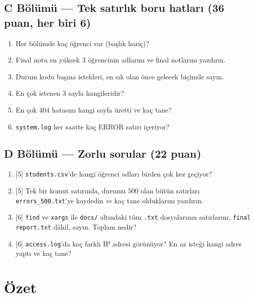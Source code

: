 \documentclass[11pt,a4paper]{article}
\newcommand{\cmd}[1]{\texttt{#1}}
\begin{document}
\subsection*{C Bölümü --- Tek satırlık boru hatları (36 puan, her biri 6)}
\begin{enumerate}[leftmargin=2.2em,label=\textbf{C\arabic*}]
  \item Her bölümde kaç öğrenci var (başlık hariç)?
  \item Final notu en yüksek $3$ öğrencinin adlarını ve final notlarını yazdırın.
  \item Durum kodu başına istekleri, en sık olan önce gelecek biçimde sayın.
  \item En çok istenen $3$ sayfa hangileridir?
  \item En çok $404$ hatasını hangi sayfa üretti ve kaç tane?
  \item \texttt{system.log} her saatte kaç ERROR satırı içeriyor?
\end{enumerate}

\subsection*{D Bölümü --- Zorlu sorular (22 puan)}
\begin{enumerate}[leftmargin=2.2em,label=\textbf{D\arabic*}]
  \item {[5]} \texttt{students.csv}'de hangi öğrenci adları birden çok kez geçiyor?
  \item {[5]} Tek bir komut satırında, durumu $500$ olan bütün satırları \texttt{errors\_500.txt}'ye kaydedin \emph{ve} kaç tane olduklarını yazdırın.
  \item {[6]} \cmd{find} ve \cmd{xargs} ile \texttt{docs/} altındaki tüm \texttt{.txt} dosyalarının satırlarını, \texttt{final report.txt} dâhil, sayın. Toplam nedir?
  \item {[6]} \texttt{access.log}'da kaç farklı IP adresi görünüyor? En az isteği hangi adres yaptı ve kaç tane?
\end{enumerate}

\section{Özet}
\end{document}
